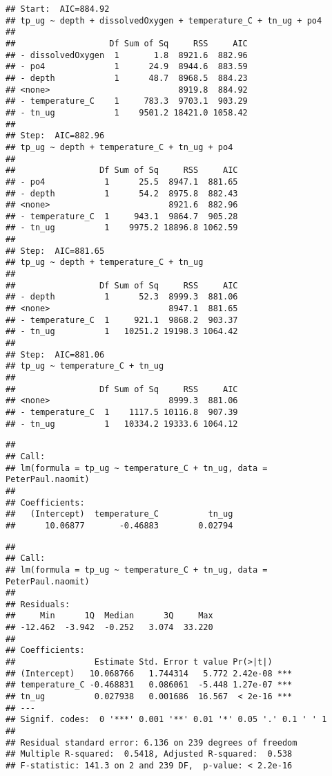 \documentclass[]{article}
\newenvironment{Shaded}{\begin{snugshade}}{\end{snugshade}}
\newcommand{\KeywordTok}[1]{\textcolor[rgb]{0.13,0.29,0.53}{\textbf{#1}}}
\newcommand{\DataTypeTok}[1]{\textcolor[rgb]{0.13,0.29,0.53}{#1}}
\newcommand{\StringTok}[1]{\textcolor[rgb]{0.31,0.60,0.02}{#1}}
\newcommand{\CommentTok}[1]{\textcolor[rgb]{0.56,0.35,0.01}{\textit{#1}}}
\newcommand{\OperatorTok}[1]{\textcolor[rgb]{0.81,0.36,0.00}{\textbf{#1}}}
\newcommand{\NormalTok}[1]{#1}
\begin{document}
\begin{verbatim}
## Start:  AIC=884.92
## tp_ug ~ depth + dissolvedOxygen + temperature_C + tn_ug + po4
## 
##                   Df Sum of Sq     RSS     AIC
## - dissolvedOxygen  1       1.8  8921.6  882.96
## - po4              1      24.9  8944.6  883.59
## - depth            1      48.7  8968.5  884.23
## <none>                          8919.8  884.92
## - temperature_C    1     783.3  9703.1  903.29
## - tn_ug            1    9501.2 18421.0 1058.42
## 
## Step:  AIC=882.96
## tp_ug ~ depth + temperature_C + tn_ug + po4
## 
##                 Df Sum of Sq     RSS     AIC
## - po4            1      25.5  8947.1  881.65
## - depth          1      54.2  8975.8  882.43
## <none>                        8921.6  882.96
## - temperature_C  1     943.1  9864.7  905.28
## - tn_ug          1    9975.2 18896.8 1062.59
## 
## Step:  AIC=881.65
## tp_ug ~ depth + temperature_C + tn_ug
## 
##                 Df Sum of Sq     RSS     AIC
## - depth          1      52.3  8999.3  881.06
## <none>                        8947.1  881.65
## - temperature_C  1     921.1  9868.2  903.37
## - tn_ug          1   10251.2 19198.3 1064.42
## 
## Step:  AIC=881.06
## tp_ug ~ temperature_C + tn_ug
## 
##                 Df Sum of Sq     RSS     AIC
## <none>                        8999.3  881.06
## - temperature_C  1    1117.5 10116.8  907.39
## - tn_ug          1   10334.2 19333.6 1064.12
\end{verbatim}

\begin{verbatim}
## 
## Call:
## lm(formula = tp_ug ~ temperature_C + tn_ug, data = PeterPaul.naomit)
## 
## Coefficients:
##   (Intercept)  temperature_C          tn_ug  
##      10.06877       -0.46883        0.02794
\end{verbatim}

\begin{Shaded}
\end{Shaded}

\begin{verbatim}
## 
## Call:
## lm(formula = tp_ug ~ temperature_C + tn_ug, data = PeterPaul.naomit)
## 
## Residuals:
##     Min      1Q  Median      3Q     Max 
## -12.462  -3.942  -0.252   3.074  33.220 
## 
## Coefficients:
##                Estimate Std. Error t value Pr(>|t|)    
## (Intercept)   10.068766   1.744314   5.772 2.42e-08 ***
## temperature_C -0.468831   0.086061  -5.448 1.27e-07 ***
## tn_ug          0.027938   0.001686  16.567  < 2e-16 ***
## ---
## Signif. codes:  0 '***' 0.001 '**' 0.01 '*' 0.05 '.' 0.1 ' ' 1
## 
## Residual standard error: 6.136 on 239 degrees of freedom
## Multiple R-squared:  0.5418, Adjusted R-squared:  0.538 
## F-statistic: 141.3 on 2 and 239 DF,  p-value: < 2.2e-16
\end{verbatim}
\end{document}
